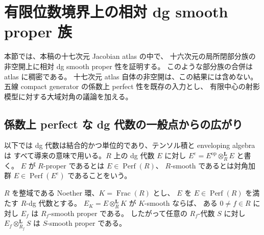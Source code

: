 \section{有限位数境界上の相対 dg smooth proper 族}
\label{sec:dg-smooth-torsion-families}

本節では、本稿の十七次元 Jacobian atlas の中で、
十六次元の局所閉部分族の非空開上に相対 dg smooth proper 性を証明する。
このような部分族の合併は atlas に稠密である。
十七次元 atlas 自体の非空開は、この結果には含めない。
五線 compact generator の係数上 perfect 性を既存の入力とし、
有限中心の射影模型に対する大域対角の議論を加える。

\subsection{係数上 perfect な dg 代数の一般点からの広がり}
\label{sec:dg-generic-spreading}

以下では dg 代数は結合的かつ単位的であり、テンソル積と enveloping algebra は
すべて導来の意味で用いる。\(R\) 上の dg 代数 \(E\) に対し
\(E^e=E^{\mathrm{op}}\otimes_R^{\mathbf L}E\) と書く。
\(E\) が \(R\)-proper であるとは \(E\in\operatorname{Perf}(R)\)、
\(R\)-smooth であるとは対角加群 \(E\in\operatorname{Perf}(E^e)\)
であることをいう。

\begin{lemma}
\label{lem:dg-generic-spreading}
\(R\) を整域である Noether 環、\(K=\operatorname{Frac}(R)\) とし、
\(E\) を \(E\in\operatorname{Perf}(R)\) を満たす \(R\)-dg 代数とする。
\(E_K=E\otimes_R^{\mathbf L}K\) が \(K\)-smooth ならば、
ある \(0\ne f\in R\) に対し \(E_f\) は \(R_f\)-smooth proper である。
したがって任意の \(R_f\)-代数 \(S\) に対し \(E_f\otimes_{R_f}^{\mathbf L}S\)
は \(S\)-smooth proper である。
\end{lemma}

